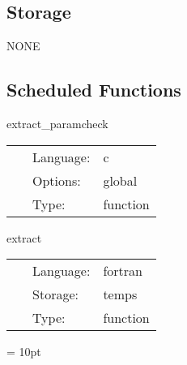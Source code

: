 \subsection*{Storage}NONE
\subsection*{Scheduled Functions}
\vspace{5mm}


\hspace{5mm} extract\_paramcheck 

\hspace{5mm}{\it check parameters } 


\hspace{5mm}

 \begin{tabular*}{160mm}{cll} 
~ & Language:  & c \\ 
~ & Options:  & global \\ 
~ & Type:  & function \\ 
\end{tabular*} 


\vspace{5mm}


\hspace{5mm} extract 

\hspace{5mm}{\it extract waveforms } 


\hspace{5mm}

 \begin{tabular*}{160mm}{cll} 
~ & Language:  & fortran \\ 
~ & Storage:  & temps \\ 
~ & Type:  & function \\ 
\end{tabular*} 



\vspace{5mm}\parskip = 10pt 

